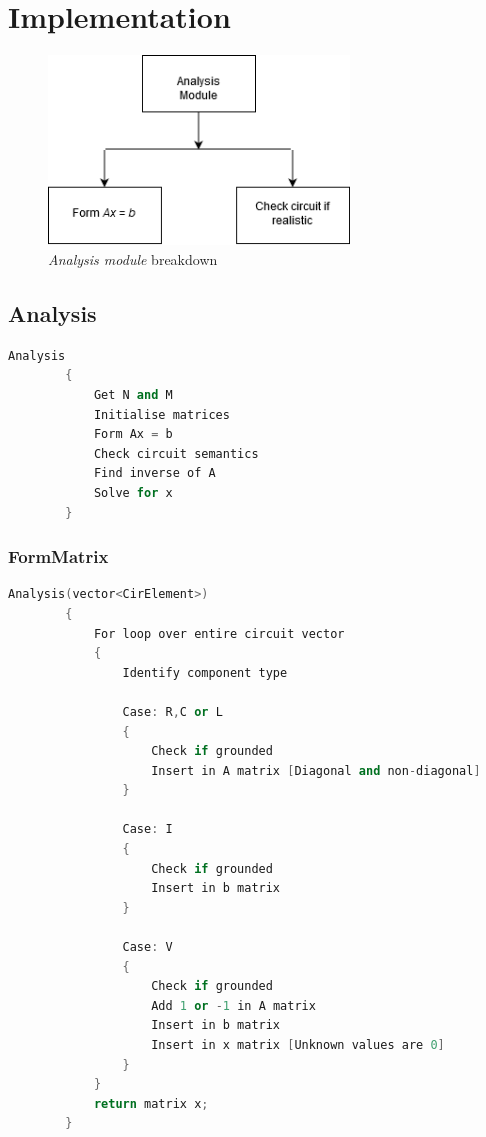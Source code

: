 \documentclass[a4paper, titlepage]{article}
\begin{document}
    \section{Implementation}
    \begin{figure}[htp]
        \centering
        \includegraphics[width=80mm,scale=1]{Analysis breakdown}
        \caption{\textit{Analysis module} breakdown}
        \label{fig:figure3}
    \end{figure}

    \subsection{Analysis}
    \begin{lstlisting}[language=C++]
        Analysis
        {
            Get N and M
            Initialise matrices
            Form Ax = b
            Check circuit semantics
            Find inverse of A
            Solve for x
        }
    \end{lstlisting}

    \subsubsection{FormMatrix}
    \begin{lstlisting}[language=C++]
        Analysis(vector<CirElement>)
        {
            For loop over entire circuit vector
            {
                Identify component type

                Case: R,C or L
                {
                    Check if grounded
                    Insert in A matrix [Diagonal and non-diagonal]
                }
                
                Case: I
                {
                    Check if grounded
                    Insert in b matrix
                }

                Case: V
                {
                    Check if grounded
                    Add 1 or -1 in A matrix             
                    Insert in b matrix
                    Insert in x matrix [Unknown values are 0]            
                }
            }
            return matrix x;
        }
    \end{lstlisting}
\end{document}
